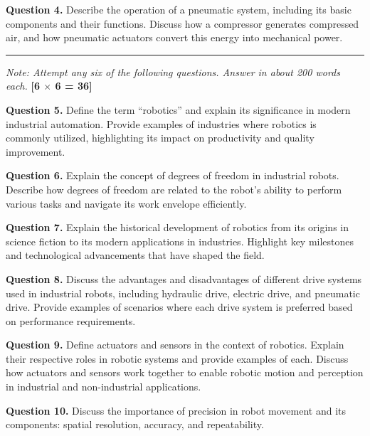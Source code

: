 \documentclass[11pt,a4paper]{article}
\begin{document}
\medskip


\noindent   \textbf{Question 4.} Describe the operation of a pneumatic system, including its basic components and their functions. Discuss how a compressor generates compressed air, and how pneumatic actuators convert this energy into mechanical power.

\bigskip


\rule{\linewidth}{0.4pt}\smallskip




\noindent   \textit{Note: Attempt any six of the following questions. Answer in about 200 words each.} \hfill   \textbf{[6 $ \times$ 6 = 36]}

\medskip


\noindent   \textbf{Question 5.} Define the term ``robotics'' and explain its significance in modern industrial automation. Provide examples of industries where robotics is commonly utilized, highlighting its impact on productivity and quality improvement.

\medskip


\noindent   \textbf{Question 6.} Explain the concept of degrees of freedom in industrial robots. Describe how degrees of freedom are related to the robot's ability to perform various tasks and navigate its work envelope efficiently.

\medskip


\noindent   \textbf{Question 7.} Explain the historical development of robotics from its origins in science fiction to its modern applications in industries. Highlight key milestones and technological advancements that have shaped the field.

\medskip


\noindent   \textbf{Question 8.} Discuss the advantages and disadvantages of different drive systems used in industrial robots, including hydraulic drive, electric drive, and pneumatic drive. Provide examples of scenarios where each drive system is preferred based on performance requirements.

\medskip


\noindent   \textbf{Question 9.} Define actuators and sensors in the context of robotics. Explain their respective roles in robotic systems and provide examples of each. Discuss how actuators and sensors work together to enable robotic motion and perception in industrial and non-industrial applications.

\medskip


\noindent   \textbf{Question 10.} Discuss the importance of precision in robot movement and its components: spatial resolution, accuracy, and repeatability.
\end{document}
